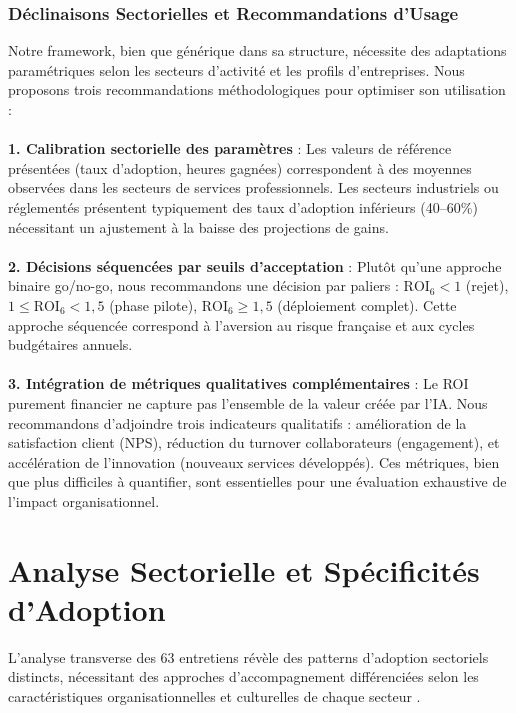 \subsubsection{Déclinaisons Sectorielles et Recommandations d'Usage}

Notre framework, bien que générique dans sa structure, nécessite des adaptations paramétriques selon les secteurs d'activité et les profils d'entreprises. Nous proposons trois recommandations méthodologiques pour optimiser son utilisation :
\\\\
\textbf{1. Calibration sectorielle des paramètres} : Les valeurs de référence présentées (taux d'adoption, heures gagnées) correspondent à des moyennes observées dans les secteurs de services professionnels. Les secteurs industriels ou réglementés présentent typiquement des taux d'adoption inférieurs (40--60\%) nécessitant un ajustement à la baisse des projections de gains.
\\\\
\textbf{2. Décisions séquencées par seuils d'acceptation} : Plutôt qu'une approche binaire go/no-go, nous recommandons une décision par paliers : $\text{ROI}_6 < 1$ (rejet), $1 \leq \text{ROI}_6 < 1{,}5$ (phase pilote), $\text{ROI}_6 \geq 1{,}5$ (déploiement complet). Cette approche séquencée correspond à l'aversion au risque française et aux cycles budgétaires annuels.
\\\\
\textbf{3. Intégration de métriques qualitatives complémentaires} : Le ROI purement financier ne capture pas l'ensemble de la valeur créée par l'IA. Nous recommandons d'adjoindre trois indicateurs qualitatifs : amélioration de la satisfaction client (NPS), réduction du turnover collaborateurs (engagement), et accélération de l'innovation (nouveaux services développés). Ces métriques, bien que plus difficiles à quantifier, sont essentielles pour une évaluation exhaustive de l'impact organisationnel.

\section{Analyse Sectorielle et Spécificités d'Adoption}

L'analyse transverse des 63 entretiens révèle des patterns d'adoption sectoriels distincts, nécessitant des approches d'accompagnement différenciées selon les caractéristiques organisationnelles et culturelles de chaque secteur \cite{luwai2025meetings}.

